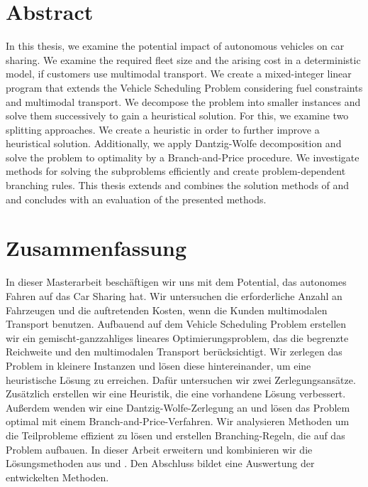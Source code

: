 \cleardoublepage

\section*{Abstract}

In this thesis, we examine the potential impact of autonomous vehicles on car sharing. We examine the required fleet size and the arising cost in a deterministic model, if customers use multimodal transport. We create a mixed-integer linear program that extends the Vehicle Scheduling Problem considering fuel constraints and multimodal transport. We decompose the problem into smaller instances and solve them successively to gain a heuristical solution. For this, we examine two splitting approaches. We create a heuristic in order to further improve a heuristical solution. Additionally, we apply Dantzig-Wolfe decomposition and solve the problem to optimality by a Branch-and-Price procedure. We investigate methods for solving the subproblems efficiently and create problem-dependent branching rules. This thesis extends and combines the solution methods of \cite{Kaiser} and \cite{Knoll} and concludes with an evaluation of the presented methods.

\section*{Zusammenfassung}

In dieser Masterarbeit beschäftigen wir uns mit dem Potential, das autonomes Fahren auf das Car Sharing hat. Wir untersuchen die erforderliche Anzahl an Fahrzeugen und die auftretenden Kosten, wenn die Kunden multimodalen Transport benutzen. Aufbauend auf dem Vehicle Scheduling Problem erstellen wir ein gemischt-ganzzahliges lineares Optimierungsproblem, das die begrenzte Reichweite und den multimodalen Transport berücksichtigt. Wir zerlegen das Problem in kleinere Instanzen und lösen diese hintereinander, um eine heuristische Lösung zu erreichen. Dafür untersuchen wir zwei Zerlegungsansätze. Zusätzlich erstellen wir eine Heuristik, die eine vorhandene Lösung verbessert. Außerdem wenden wir eine Dantzig-Wolfe-Zerlegung an und lösen das Problem optimal mit einem Branch-and-Price-Verfahren. Wir analysieren Methoden um die Teilprobleme effizient zu lösen und erstellen Branching-Regeln, die auf das Problem aufbauen. In dieser Arbeit erweitern und kombinieren wir die Lösungsmethoden aus \cite{Kaiser} und \cite{Knoll}. Den Abschluss bildet eine Auswertung der entwickelten Methoden.

